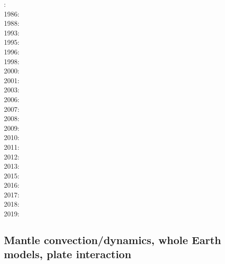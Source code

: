 : \cite{scst84}\cite{mcke84}\\
1986: \cite{scst86}\\
1988: \cite{scot88}\\
1993: \cite{spie93}\\
1995: \cite{bisc95}\\
1996: \cite{laki96}\\
1998: \cite{rabg98}\\
2000: \cite{elha00}\\
2001: \cite{bers01}\\
2003: \cite{beri03}\\
2006: \cite{onmm06}\\
2007: \cite{srrb07}\cite{mohb07}\cite{elki07}\cite{copb07}\\
2008: \cite{hets08}\cite{hest08}\\
2009: \cite{bavi09}\\
2010: \cite{baiv10}\cite{habl10}\cite{cows10}\\
2011: \cite{baiv11}\cite{zhgy11}\cite{zhgh11}\cite{bics11}\\
2012: \cite{yatd12}\\
2013: \cite{kemk13}\cite{mofm13}\\
2015: \cite{tukb15}\cite{moba15}\\
2016: \cite{keka16}\\
2017: \cite{dilc17}\\
2018: \cite{lorg18}\\
2019: \cite{dagg19}

\subsection*{Mantle convection/dynamics, whole Earth models, plate interaction}

